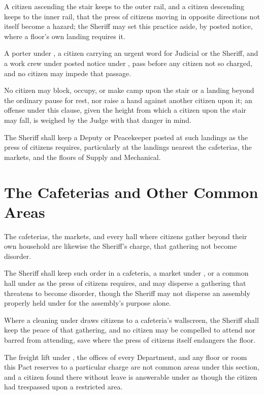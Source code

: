 \begin{clauses}
\item A citizen ascending the stair keeps to the outer rail, and a citizen descending keeps to the inner rail, that the press of citizens moving in opposite directions not itself become a hazard; the Sheriff may set this practice aside, by posted notice, where a floor's own landing requires it.
\item A porter under , a citizen carrying an urgent word for Judicial or the Sheriff, and a work crew under posted notice under , pass before any citizen not so charged, and no citizen may impede that passage.
\item No citizen may block, occupy, or make camp upon the stair or a landing beyond the ordinary pause for rest, nor raise a hand against another citizen upon it; an offense under this clause, given the height from which a citizen upon the stair may fall, is weighed by the Judge with that danger in mind.
\item The Sheriff shall keep a Deputy or Peacekeeper posted at such landings as the press of citizens requires, particularly at the landings nearest the cafeterias, the markets, and the floors of Supply and Mechanical.
\end{clauses}

\section{The Cafeterias and Other Common Areas}
\label{sec:sheriff:cafeterias-and-other-common-areas}

The cafeterias, the markets, and every hall where citizens gather beyond their own household are likewise the Sheriff's charge, that gathering not become disorder.

\begin{clauses}
\item The Sheriff shall keep such order in a cafeteria, a market under , or a common hall under  as the press of citizens requires, and may disperse a gathering that threatens to become disorder, though the Sheriff may not disperse an assembly properly held under  for the assembly's purpose alone.
\item Where a cleaning under  draws citizens to a cafeteria's wallscreen, the Sheriff shall keep the peace of that gathering, and no citizen may be compelled to attend nor barred from attending, save where the press of citizens itself endangers the floor.
\item The freight lift under , the offices of every Department, and any floor or room this Pact reserves to a particular charge are not common areas under this section, and a citizen found there without leave is answerable under  as though the citizen had trespassed upon a restricted area.
\end{clauses}

